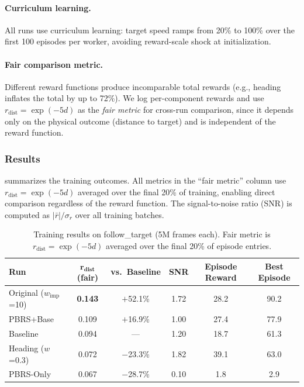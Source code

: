 \documentclass[11pt]{article}
\begin{document}
\paragraph{Curriculum learning.}
All runs use curriculum learning: target speed ramps from 20\% to 100\% over the first 100 episodes per worker, avoiding reward-scale shock at initialization.

\paragraph{Fair comparison metric.}
Different reward functions produce incomparable total rewards (e.g., heading inflates the total by up to 72\%).
We log per-component rewards and use $r_{\text{dist}} = \exp(-5d)$ as the \emph{fair metric} for cross-run comparison, since it depends only on the physical outcome (distance to target) and is independent of the reward function.

\subsubsection{Results}
\label{sec:rl-dismech:results}

 summarizes the training outcomes.
All metrics in the ``fair metric'' column use $r_{\text{dist}} = \exp(-5d)$ averaged over the final 20\% of training, enabling direct comparison regardless of the reward function.
The signal-to-noise ratio (SNR) is computed as $|\bar{r}| / \sigma_r$ over all training batches.

\begin{table}[H]
  \centering
  \small
  \renewcommand{\arraystretch}{1.3}
  \caption{Training results on follow\_target (5M frames each). Fair metric is $r_{\text{dist}} = \exp(-5d)$ averaged over the final 20\% of episode entries.}
  \label{tab:choi2025-results}
  \begin{tabular}{@{}lccccc@{}}
    \toprule
    \textbf{Run} & $\boldsymbol{r_{\textbf{dist}}}$ \textbf{(fair)} & \textbf{vs.\ Baseline} & \textbf{SNR} & \textbf{Episode Reward} & \textbf{Best Episode} \\
    \midrule
    Original ($w_{\text{imp}}$=10) & \textbf{0.143} & $+$52.1\% & 1.72 & 28.2 & 90.2 \\
    PBRS+Base       & 0.109 & $+$16.9\% & 1.00 & 27.4 & 77.9 \\
    Baseline        & 0.094 & ---      & 1.20 & 18.7 & 61.3 \\
    Heading ($w$=0.3) & 0.072 & $-$23.3\% & 1.82 & 39.1 & 63.0 \\
    PBRS-Only       & 0.067 & $-$28.7\% & 0.10 & 1.8  & 2.9  \\
    \bottomrule
  \end{tabular}
\end{table}
\end{document}

